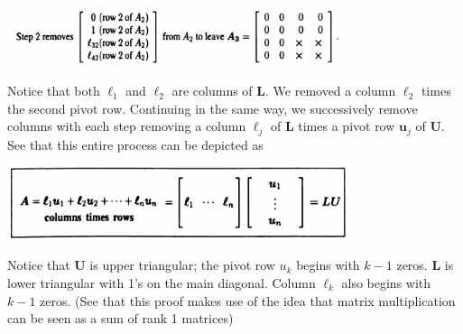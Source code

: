 \documentclass{report}
\begin{document}
\begin{center}
\includegraphics[width=10cm]{10}
\end{center}
Notice that both $\bm\ell_1$ and $\bm\ell_2$ are columns of $\bm L$.
We removed a column $\bm\ell_2$ times the second pivot row. Continuing in the same way, we successively remove columns with each step removing a column
$\bm\ell_j$ of $\bm L$ times a pivot row $\bm u_j$ of $\bm U$. See that this entire process can be depicted as
\begin{center}
\includegraphics[width=10cm]{11}
\end{center}
Notice that $\bm U$ is upper triangular; the pivot row $u_k$ begins with $k-1$ zeros. $\bm L$ is lower triangular with 1's on the main diagonal. Column 
$\bm\ell_k$ also begins with $k-1$ zeros. (See that this proof makes use of the
idea that matrix multiplication can be seen as a sum of rank 1 matrices)
\newpage
\end{document}
